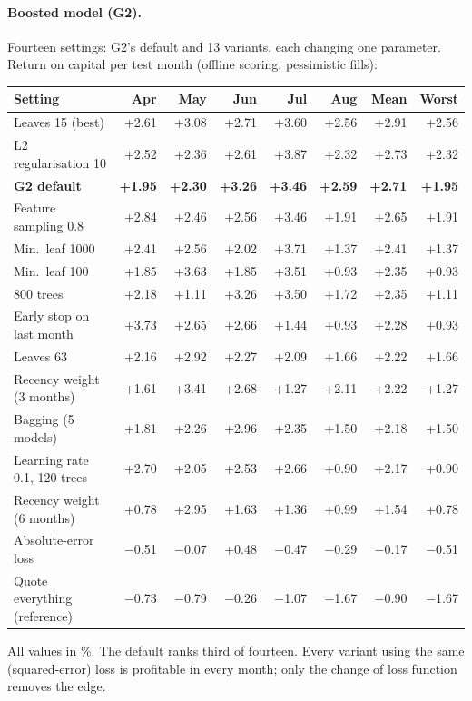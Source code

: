 \documentclass[11pt,a4paper]{article}
\begin{document}
\paragraph{Boosted model (G2).} Fourteen settings: G2's default and 13 variants, each changing one parameter.
Return on capital per test month (offline scoring, pessimistic fills):
\begin{center}
\small
\begin{tabular}{@{}lrrrrrrr@{}}
\toprule
Setting & Apr & May & Jun & Jul & Aug & Mean & Worst \\
\midrule
Leaves 15 (best) & +2.61 & +3.08 & +2.71 & +3.60 & +2.56 & +2.91 & +2.56 \\
L2 regularisation 10 & +2.52 & +2.36 & +2.61 & +3.87 & +2.32 & +2.73 & +2.32 \\
\textbf{G2 default} & \textbf{+1.95} & \textbf{+2.30} & \textbf{+3.26} & \textbf{+3.46} & \textbf{+2.59} & \textbf{+2.71} & \textbf{+1.95} \\
Feature sampling 0.8 & +2.84 & +2.46 & +2.56 & +3.46 & +1.91 & +2.65 & +1.91 \\
Min.\ leaf 1000 & +2.41 & +2.56 & +2.02 & +3.71 & +1.37 & +2.41 & +1.37 \\
Min.\ leaf 100 & +1.85 & +3.63 & +1.85 & +3.51 & +0.93 & +2.35 & +0.93 \\
800 trees & +2.18 & +1.11 & +3.26 & +3.50 & +1.72 & +2.35 & +1.11 \\
Early stop on last month & +3.73 & +2.65 & +2.66 & +1.44 & +0.93 & +2.28 & +0.93 \\
Leaves 63 & +2.16 & +2.92 & +2.27 & +2.09 & +1.66 & +2.22 & +1.66 \\
Recency weight (3 months) & +1.61 & +3.41 & +2.68 & +1.27 & +2.11 & +2.22 & +1.27 \\
Bagging (5 models) & +1.81 & +2.26 & +2.96 & +2.35 & +1.50 & +2.18 & +1.50 \\
Learning rate 0.1, 120 trees & +2.70 & +2.05 & +2.53 & +2.66 & +0.90 & +2.17 & +0.90 \\
Recency weight (6 months) & +0.78 & +2.95 & +1.63 & +1.36 & +0.99 & +1.54 & +0.78 \\
Absolute-error loss & $-$0.51 & $-$0.07 & +0.48 & $-$0.47 & $-$0.29 & $-$0.17 & $-$0.51 \\
\midrule
Quote everything (reference) & $-$0.73 & $-$0.79 & $-$0.26 & $-$1.07 & $-$1.67 & $-$0.90 & $-$1.67 \\
\bottomrule
\end{tabular}
\end{center}
All values in \%. The default ranks third of fourteen. Every variant using the same (squared-error) loss is
profitable in every month; only the change of loss function removes the edge.
\end{document}
